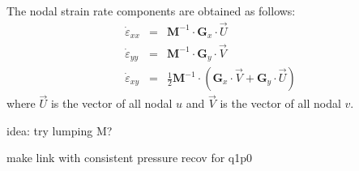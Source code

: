 The nodal strain rate components are obtained as follows:
\begin{eqnarray}
\dot{\varepsilon}_{xx} &=& {\bm M}^{-1} \cdot {\bm G}_x \cdot \vec{U} \\
\dot{\varepsilon}_{yy} &=& {\bm M}^{-1} \cdot {\bm G}_y \cdot \vec{V} \\
\dot{\varepsilon}_{xy} &=& \frac{1}{2} {\bm M}^{-1} \cdot \left( {\bm G}_x \cdot \vec{V} + {\bm G}_y \cdot \vec{U} \right)
\end{eqnarray}
where $\vec{U}$ is the vector of all nodal $u$ and $\vec{V}$ is the vector of all nodal $v$.


idea: try lumping M?

make link with consistent pressure recov for q1p0








